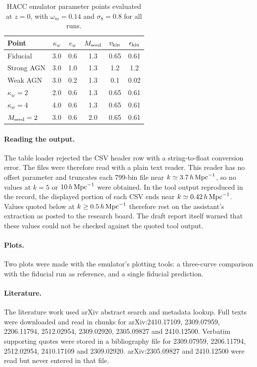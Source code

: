 \documentclass[11pt,a4paper]{article}
\begin{document}
\begin{table}
\centering
\begin{tabular}{lccccc}
\toprule
Point & $\kappa_w$ & $e_w$ & $M_{\rm seed}$ & $v_{\rm kin}$ & $\epsilon_{\rm kin}$\\
\midrule
Fiducial & 3.0 & 0.6 & 1.3 & 0.65 & 0.61\\
Strong AGN & 3.0 & 1.0 & 1.3 & 1.2 & 1.2\\
Weak AGN & 3.0 & 0.2 & 1.3 & 0.1 & 0.02\\
$\kappa_w=2$ & 2.0 & 0.6 & 1.3 & 0.65 & 0.61\\
$\kappa_w=4$ & 4.0 & 0.6 & 1.3 & 0.65 & 0.61\\
$M_{\rm seed}=2$ & 3.0 & 0.6 & 2.0 & 0.65 & 0.61\\
\bottomrule
\end{tabular}
\caption{HACC emulator parameter points evaluated at $z=0$, with $\omega_m=0.14$ and $\sigma_8=0.8$ for all runs.}
\label{tab:points}
\end{table}

\paragraph{Reading the output.} The table loader rejected the CSV header row with a string-to-float conversion error. The files were therefore read with a plain text reader. This reader has no offset parameter and truncates each 799-bin file near $k\simeq3.7\,h\,{\rm Mpc}^{-1}$, so no values at $k=5$ or $10\,h\,{\rm Mpc}^{-1}$ were obtained. In the tool output reproduced in the record, the displayed portion of each CSV ends near $k\simeq0.42\,h\,{\rm Mpc}^{-1}$. Values quoted below at $k\geq0.5\,h\,{\rm Mpc}^{-1}$ therefore rest on the assistant's extraction as posted to the research board. The draft report itself warned that these values could not be checked against the quoted tool output.

\paragraph{Plots.} Two plots were made with the emulator's plotting tools: a three-curve comparison with the fiducial run as reference, and a single fiducial prediction.

\paragraph{Literature.} The literature work used arXiv abstract search and metadata lookup. Full texts were downloaded and read in chunks for arXiv:2410.17109, 2309.07959, 2206.11794, 2512.02954, 2309.02920, 2305.09827 and 2410.12500. Verbatim supporting quotes were stored in a bibliography file for 2309.07959, 2206.11794, 2512.02954, 2410.17109 and 2309.02920. arXiv:2305.09827 and 2410.12500 were read but never entered in that file.
\end{document}
